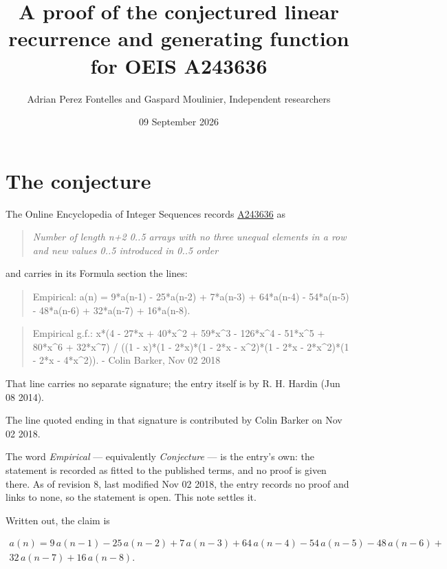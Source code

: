 \documentclass[11pt]{article}
\title{A proof of the conjectured linear recurrence and generating function for OEIS A243636}
\author{Adrian Perez Fontelles and Gaspard Moulinier, Independent researchers}
\date{09 September 2026}
\theoremstyle{definition}
\begin{document}
\maketitle
\section{The conjecture}

The Online Encyclopedia of Integer Sequences records \href{https://oeis.org/A243636}{A243636} as

\begin{quote}\itshape Number of length n+2 0..5 arrays with no three unequal elements in a row and new values 0..5 introduced in 0..5 order\end{quote}

and carries in its Formula section the lines:

\begin{quote}\ttfamily Empirical: a(n) = 9*a(n-1) - 25*a(n-2) + 7*a(n-3) + 64*a(n-4) - 54*a(n-5) - 48*a(n-6) + 32*a(n-7) + 16*a(n-8).\end{quote}

\begin{quote}\ttfamily Empirical g.f.: x*(4 - 27*x + 40*x\textasciicircum{}2 + 59*x\textasciicircum{}3 - 126*x\textasciicircum{}4 - 51*x\textasciicircum{}5 + 80*x\textasciicircum{}6 + 32*x\textasciicircum{}7) / ((1 - x)*(1 - 2*x)*(1 - 2*x - x\textasciicircum{}2)*(1 - 2*x - 2*x\textasciicircum{}2)*(1 - 2*x - 4*x\textasciicircum{}2)). - Colin Barker, Nov 02 2018\end{quote}

That line carries no separate signature; the entry itself is by R. H. Hardin (Jun 08 2014).

The line quoted ending in that signature is contributed by Colin Barker on Nov 02 2018.

The word {\itshape Empirical} --- equivalently {\itshape Conjecture} --- is the entry's own: the statement is recorded as fitted to the published terms, and no proof is given there. As of revision 8, last modified Nov 02 2018, the entry records no proof and links to none, so the statement is open. This note settles it.

Written out, the claim is

\begin{multline*} a(n) = 9\,a(n-1) - 25\,a(n-2) + 7\,a(n-3) + 64\,a(n-4) - 54\,a(n-5) - 48\,a(n-6) + \\ 32\,a(n-7) + 16\,a(n-8). \end{multline*}
\end{document}
